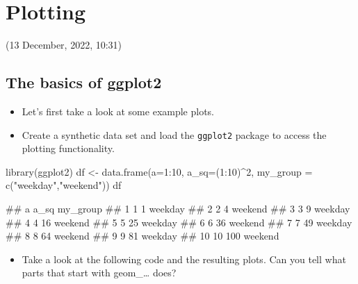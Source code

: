 \documentclass[
]{book}
\newenvironment{Shaded}{\begin{snugshade}}{\end{snugshade}}
\newcommand{\AttributeTok}[1]{\textcolor[rgb]{0.77,0.63,0.00}{#1}}
\newcommand{\DecValTok}[1]{\textcolor[rgb]{0.00,0.00,0.81}{#1}}
\newcommand{\FunctionTok}[1]{\textcolor[rgb]{0.00,0.00,0.00}{#1}}
\newcommand{\NormalTok}[1]{#1}
\newcommand{\OtherTok}[1]{\textcolor[rgb]{0.56,0.35,0.01}{#1}}
\newcommand{\SpecialCharTok}[1]{\textcolor[rgb]{0.00,0.00,0.00}{#1}}
\newcommand{\StringTok}[1]{\textcolor[rgb]{0.31,0.60,0.02}{#1}}
\providecommand{\tightlist}{%
  \setlength{\itemsep}{0pt}\setlength{\parskip}{0pt}}
\begin{document}
\hypertarget{plotting-1}{%
\chapter{Plotting}\label{plotting-1}}

(13 December, 2022, 10:31)

\hypertarget{the-basics-of-ggplot2}{%
\section{The basics of ggplot2}\label{the-basics-of-ggplot2}}

\begin{itemize}
\tightlist
\item
  Let's first take a look at some example plots.
\item
  Create a synthetic data set and load the \texttt{ggplot2} package to access the plotting functionality.
\end{itemize}

\begin{Shaded}
\begin{Highlighting}[]
\FunctionTok{library}\NormalTok{(ggplot2)}
\NormalTok{df }\OtherTok{\textless{}{-}} \FunctionTok{data.frame}\NormalTok{(}\AttributeTok{a=}\DecValTok{1}\SpecialCharTok{:}\DecValTok{10}\NormalTok{, }\AttributeTok{a\_sq=}\NormalTok{(}\DecValTok{1}\SpecialCharTok{:}\DecValTok{10}\NormalTok{)}\SpecialCharTok{\^{}}\DecValTok{2}\NormalTok{, }\AttributeTok{my\_group =} \FunctionTok{c}\NormalTok{(}\StringTok{"weekday"}\NormalTok{,}\StringTok{"weekend"}\NormalTok{))}
\NormalTok{df}
\end{Highlighting}
\end{Shaded}

\begin{Shaded}
\begin{Highlighting}[]
\NormalTok{\#\#     a a\_sq my\_group}
\NormalTok{\#\# 1   1    1  weekday}
\NormalTok{\#\# 2   2    4  weekend}
\NormalTok{\#\# 3   3    9  weekday}
\NormalTok{\#\# 4   4   16  weekend}
\NormalTok{\#\# 5   5   25  weekday}
\NormalTok{\#\# 6   6   36  weekend}
\NormalTok{\#\# 7   7   49  weekday}
\NormalTok{\#\# 8   8   64  weekend}
\NormalTok{\#\# 9   9   81  weekday}
\NormalTok{\#\# 10 10  100  weekend}
\end{Highlighting}
\end{Shaded}

\begin{itemize}
\tightlist
\item
  Take a look at the following code and the resulting plots. Can you tell what parts that start with geom\_\ldots{} does?
\end{itemize}
\end{document}
